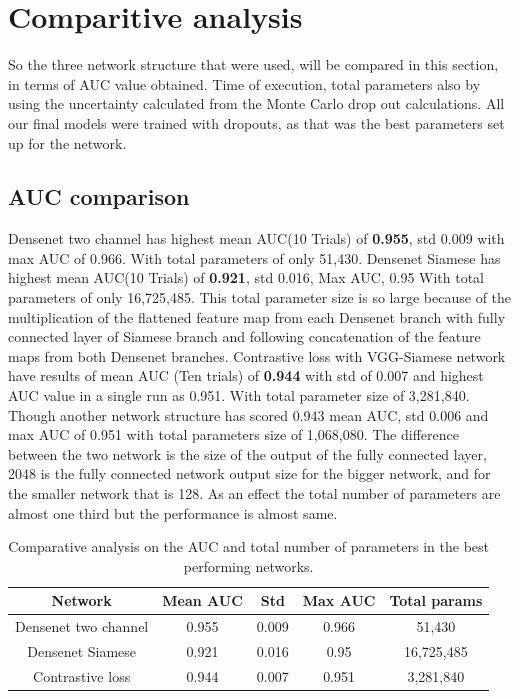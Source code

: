 \section{Comparitive analysis}
So the three network structure that were used, will be compared in this section, in terms of AUC value obtained. Time of execution, total parameters also by using the uncertainty calculated from the Monte Carlo 
drop out calculations. All our final models were trained with dropouts, as that was the best parameters set up for the network. 

\subsection{AUC comparison}
Densenet two channel has highest mean AUC(10 Trials) of \textbf{0.955}, std 0.009 with max AUC of 0.966. With total parameters of only 51,430. 
Densenet Siamese has highest mean AUC(10 Trials) of \textbf{0.921}, std 0.016, Max AUC, 0.95 With total parameters of only 16,725,485. This total parameter size is so large because of the multiplication of the flattened
feature map from each Densenet branch with fully connected layer of Siamese branch and following concatenation of the feature maps from both Densenet branches.
Contrastive loss with VGG-Siamese network have results of mean AUC (Ten trials) of \textbf{0.944} with std of 0.007 and highest AUC value in a single run as 0.951. With total parameter size of 3,281,840. Though another 
network structure has scored 0.943 mean AUC, std 0.006 and max AUC of 0.951 with total parameters size of 1,068,080. The difference between the two network is the size of the output of the fully connected layer, 2048 is 
the fully connected network output size for the bigger network, and for the smaller network that is 128. As an effect the total number of parameters are almost one third but the performance is almost same. 

\begin{center}
\begin{table}
\begin{tabular}{|c c c c c|} 
 \hline\hline
 Network & Mean AUC & Std & Max AUC & Total params\\ \hline
 Densenet two channel & 0.955 & 0.009 & 0.966 & 51,430\\
 Densenet Siamese & 0.921 & 0.016 & 0.95 & 16,725,485 \\
 Contrastive loss & 0.944 & 0.007 & 0.951 & 3,281,840\\ \hline \hline
 \end{tabular}
 \caption{Comparative analysis on the AUC and total number of parameters in the best performing networks.}
\label{table:comparative_auc_results}
\end{table}
\end{center}
